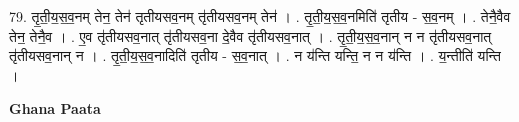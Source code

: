 \documentclass[17pt]{extarticle}
\begin{document}
79. तृ॒ती॒य॒स॒व॒नम् तेन॒ तेन॑ तृतीयसव॒नम् तृ॑तीयसव॒नम् तेन॑ । . तृ॒ती॒य॒स॒व॒नमिति॑ तृतीय - स॒व॒नम् । . तेनै॒वैव तेन॒ तेनै॒व । . ए॒व तृ॑तीयसव॒नात् तृ॑तीयसव॒ना दे॒वैव तृ॑तीयसव॒नात् । . तृ॒ती॒य॒स॒व॒नान् न न तृ॑तीयसव॒नात् तृ॑तीयसव॒नान् न । . तृ॒ती॒य॒स॒व॒नादिति॑ तृतीय - स॒व॒नात् । . न य॑न्ति यन्ति॒ न न य॑न्ति । . य॒न्तीति॑ यन्ति । \newline

\textbf{Ghana Paata } \newline
\end{document}
